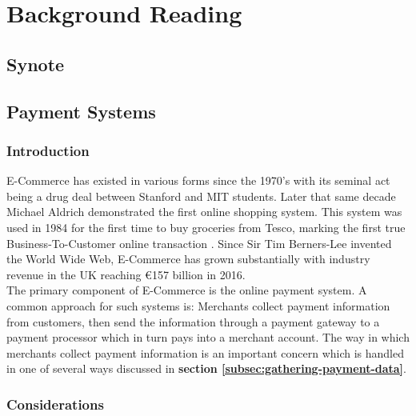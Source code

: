 \chapter{Background Reading}
\label{chap:background-reading}

\section{Synote}
\label{sec:synote}

\section{Payment Systems}
\label{sec:payment-systems}



\subsection{Introduction}
\label{sec:payment-intro}

E-Commerce has existed in various forms since the 1970's with its seminal act being a drug deal between Stanford and MIT students\cite{power-mike-online-highs}. Later that same decade Michael Aldrich demonstrated the first online shopping system. This system was used in 1984 for the first time to buy groceries from Tesco, marking the first true Business-To-Customer online transaction \cite{winterman-kelly-online-shopper}. Since Sir Tim Berners-Lee invented the World Wide Web, E-Commerce has grown substantially with industry revenue in the UK reaching \euro{157 billion} in 2016\cite{khaksar-2016}.\\ 

The primary component of E-Commerce is the online payment system. A common approach for such systems is: Merchants collect payment information from customers, then send the information through a payment gateway to a payment processor which in turn pays into a merchant account. The way in which merchants collect payment information is an important concern which is handled in one of several ways discussed in \textbf{section \ref{subsec:gathering-payment-data}}.   

\subsection{Considerations}
\label{subsec:considerations}


